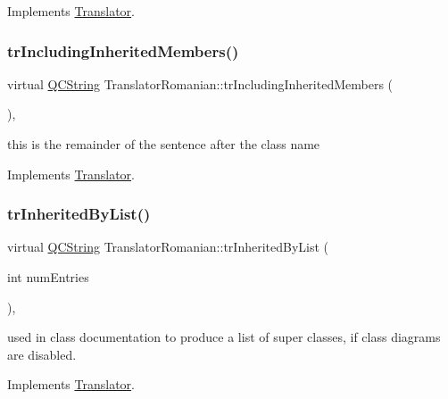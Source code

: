 Implements \mbox{\hyperlink{class_translator}{Translator}}.

\mbox{\label{class_translator_romanian_a2074e7b879ca371dd1d5841594bde192}} 
\subsubsection{\texorpdfstring{trIncludingInheritedMembers()}{trIncludingInheritedMembers()}}
{\footnotesize\ttfamily virtual \mbox{\hyperlink{class_q_c_string}{Q\+C\+String}} Translator\+Romanian\+::tr\+Including\+Inherited\+Members (\begin{DoxyParamCaption}{ }\end{DoxyParamCaption})\hspace{0.3cm}{\ttfamily [inline]}, {\ttfamily [virtual]}}

this is the remainder of the sentence after the class name 

Implements \mbox{\hyperlink{class_translator}{Translator}}.

\mbox{\label{class_translator_romanian_a4bf9783986e9239ffaf28d4fdd494e57}} 
\subsubsection{\texorpdfstring{trInheritedByList()}{trInheritedByList()}}
{\footnotesize\ttfamily virtual \mbox{\hyperlink{class_q_c_string}{Q\+C\+String}} Translator\+Romanian\+::tr\+Inherited\+By\+List (\begin{DoxyParamCaption}\item[{int}]{num\+Entries }\end{DoxyParamCaption})\hspace{0.3cm}{\ttfamily [inline]}, {\ttfamily [virtual]}}

used in class documentation to produce a list of super classes, if class diagrams are disabled. 

Implements \mbox{\hyperlink{class_translator}{Translator}}.

\mbox{\label{class_translator_romanian_af022aeccd7b109d4bafe7a91300783dd}} 
